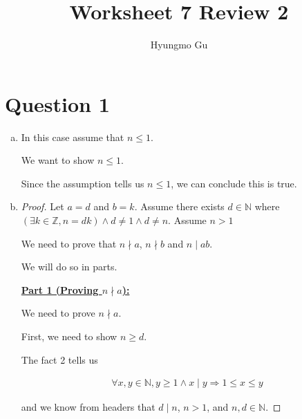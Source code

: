 \documentclass[12pt]{article}
\begin{document}
\title{Worksheet 7 Review 2}
\author{Hyungmo Gu}
\maketitle

\section*{Question 1}
\begin{enumerate}[a.]
    \item

    In this case assume that $n \leq 1$.

    \bigskip

    We want to show $n \leq 1$.

    \bigskip

    Since the assumption tells us $n \leq 1$, we can conclude this is true.

    \item

    \begin{proof}

    Let $a = d$ and $b = k$. Assume there exists $d \in \mathbb{N}$ where
    $(\exists k \in \mathbb{Z}, n = dk) \land d \neq 1 \land d \neq n$. Assume $n > 1$

    \bigskip

    We need to prove that $n \nmid a$, $n \nmid b$ and $n \mid ab$.

    \bigskip

    We will do so in parts.

    \bigskip

    \underline{\textbf{Part 1 (Proving $n \nmid a$):}}

    \bigskip

    We need to prove $n \nmid a$.

    \bigskip

    First, we need to show $n \geq d$.

    \bigskip

    The fact 2 tells us

    \begin{align}
        \forall x,y \in \mathbb{N}, y \geq 1 \land x \mid y \Rightarrow 1 \leq x \leq y
    \end{align}

    and we know from headers that $d \mid n$, $n > 1$, and $n,d \in \mathbb{N}$.

    \bigskip


\end{proof}
\end{enumerate}
\end{document}
